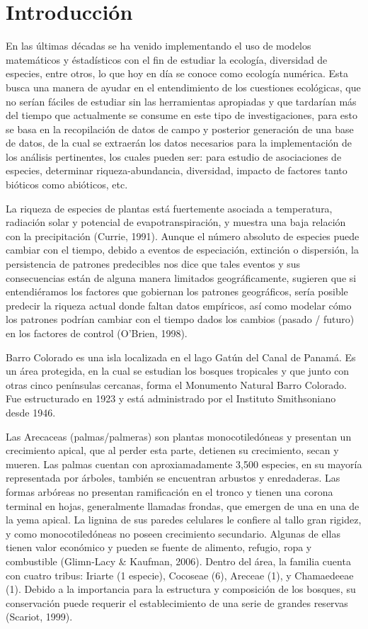\documentclass[11pt,]{article}
\begin{document}
\noindent  \section{Introducción}\label{introducciuxf3n}

En las últimas décadas se ha venido implementando el uso de modelos
matemáticos y éstadísticos con el fin de estudiar la ecología,
diversidad de especies, entre otros, lo que hoy en día se conoce como
ecología numérica. Esta busca una manera de ayudar en el entendimiento
de los cuestiones ecológicas, que no serían fáciles de estudiar sin las
herramientas apropiadas y que tardarían más del tiempo que actualmente
se consume en este tipo de investigaciones, para esto se basa en la
recopilación de datos de campo y posterior generación de una base de
datos, de la cual se extraerán los datos necesarios para la
implementación de los análisis pertinentes, los cuales pueden ser: para
estudio de asociaciones de especies, determinar riqueza-abundancia,
diversidad, impacto de factores tanto bióticos como abióticos, etc.

La riqueza de especies de plantas está fuertemente asociada a
temperatura, radiación solar y potencial de evapotranspiración, y
muestra una baja relación con la precipitación (Currie, 1991). Aunque el
número absoluto de especies puede cambiar con el tiempo, debido a
eventos de especiación, extinción o dispersión, la persistencia de
patrones predecibles nos dice que tales eventos y sus consecuencias
están de alguna manera limitados geográficamente, sugieren que si
entendiéramos los factores que gobiernan los patrones geográficos, sería
posible predecir la riqueza actual donde faltan datos empíricos, así
como modelar cómo los patrones podrían cambiar con el tiempo dados los
cambios (pasado / futuro) en los factores de control (O'Brien, 1998).

Barro Colorado es una isla localizada en el lago Gatún del Canal de
Panamá. Es un área protegida, en la cual se estudian los bosques
tropicales y que junto con otras cinco penínsulas cercanas, forma el
Monumento Natural Barro Colorado. Fue estructurado en 1923 y está
administrado por el Instituto Smithsoniano desde 1946.

Las Arecaceas (palmas/palmeras) son plantas monocotiledóneas y presentan
un crecimiento apical, que al perder esta parte, detienen su
crecimiento, secan y mueren. Las palmas cuentan con aproxiamadamente
3,500 especies, en su mayoría representada por árboles, también se
encuentran arbustos y enredaderas. Las formas arbóreas no presentan
ramificación en el tronco y tienen una corona terminal en hojas,
generalmente llamadas frondas, que emergen de una en una de la yema
apical. La lignina de sus paredes celulares le confiere al tallo gran
rigidez, y como monocotiledóneas no poseen crecimiento secundario.
Algunas de ellas tienen valor económico y pueden se fuente de alimento,
refugio, ropa y combustible (Glimn-Lacy \& Kaufman, 2006). Dentro del
área, la familia cuenta con cuatro tribus: Iriarte (1 especie), Cocoseae
(6), Areceae (1), y Chamaedeeae (1). Debido a la importancia para la
estructura y composición de los bosques, su conservación puede requerir
el establecimiento de una serie de grandes reservas (Scariot, 1999).
\end{document}
